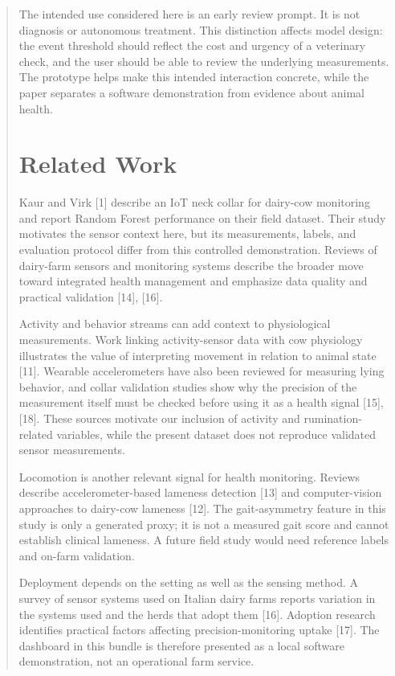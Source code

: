 \documentclass[journal]{IEEEtran}
\begin{document}
\begin{abstract}
The intended use considered here is an early review prompt. It is not diagnosis or autonomous treatment. This distinction affects model design: the event threshold should reflect the cost and urgency of a veterinary check, and the user should be able to review the underlying measurements. The prototype helps make this intended interaction concrete, while the paper separates a software demonstration from evidence about animal health.

\section{Related Work}

Kaur and Virk [1] describe an IoT neck collar for dairy-cow monitoring and report Random Forest performance on their field dataset. Their study motivates the sensor context here, but its measurements, labels, and evaluation protocol differ from this controlled demonstration. Reviews of dairy-farm sensors and monitoring systems describe the broader move toward integrated health management and emphasize data quality and practical validation [14], [16].

Activity and behavior streams can add context to physiological measurements. Work linking activity-sensor data with cow physiology illustrates the value of interpreting movement in relation to animal state [11]. Wearable accelerometers have also been reviewed for measuring lying behavior, and collar validation studies show why the precision of the measurement itself must be checked before using it as a health signal [15], [18]. These sources motivate our inclusion of activity and rumination-related variables, while the present dataset does not reproduce validated sensor measurements.

Locomotion is another relevant signal for health monitoring. Reviews describe accelerometer-based lameness detection [13] and computer-vision approaches to dairy-cow lameness [12]. The gait-asymmetry feature in this study is only a generated proxy; it is not a measured gait score and cannot establish clinical lameness. A future field study would need reference labels and on-farm validation.

Deployment depends on the setting as well as the sensing method. A survey of sensor systems used on Italian dairy farms reports variation in the systems used and the herds that adopt them [16]. Adoption research identifies practical factors affecting precision-monitoring uptake [17]. The dashboard in this bundle is therefore presented as a local software demonstration, not an operational farm service.


\end{abstract}
\end{document}
